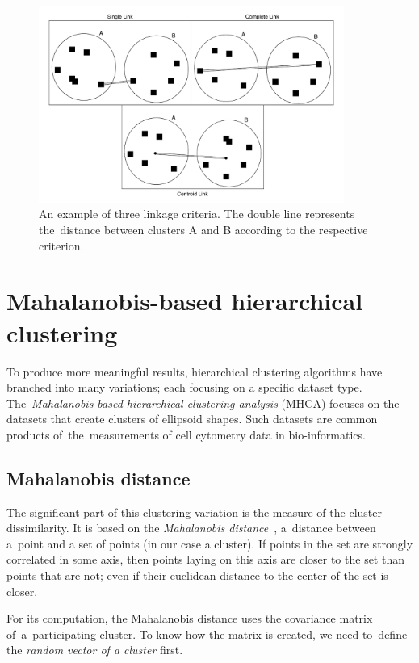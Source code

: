 \begin{figure}\centering
	\includegraphics[width=10cm]{img/linkage_criteria}
	\caption{An example of three linkage criteria. The double line represents the~distance between clusters A and B according to the respective criterion.}
	\label{fig01:link}
\end{figure}

\section{Mahalanobis-based hierarchical clustering}

To produce more meaningful results, hierarchical clustering algorithms have branched into many variations; each focusing on a specific dataset type. The~\emph{Ma\-ha\-la\-no\-bis-based hierarchical clustering analysis} (MHCA) focuses on the datasets that create clusters of ellipsoid shapes. Such datasets are common products of~the~measurements of cell cytometry data in bio-informatics.

\subsection{Mahalanobis distance}

The significant part of this clustering variation is the measure of the cluster dissimilarity. It is based on the \emph{Mahalanobis distance}~\cite{mahalanobis1936generalized}, a~distance between a~point and a set of points (in our case a cluster). If points in the set are strongly correlated in some axis, then points laying on this axis are closer to the set than points that are not; even if their euclidean distance to the center of the set is closer.

For its computation, the Mahalanobis distance uses the covariance matrix of~a~participating cluster. To know how the matrix is created, we need to~define the \emph{random vector of a cluster} first. 

